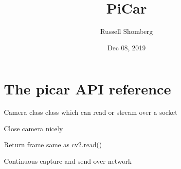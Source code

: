 \documentclass[letterpaper,10pt,english]{sphinxmanual}
\title{PiCar}
\date{Dec 08, 2019}
\author{Russell Shomberg}
\begin{document}
\pagestyle{empty}
\sphinxmaketitle
\pagestyle{plain}
\sphinxtableofcontents
\pagestyle{normal}
\label{\detokenize{index::doc}}



\chapter{The picar API reference}
\label{\detokenize{index:module-picar}}\label{\detokenize{index:the-picar-api-reference}}

\begin{fulllineitems}
\label{\detokenize{index:picar.Camera}}
Camera class class which can read or stream over a socket

\begin{fulllineitems}
\label{\detokenize{index:picar.Camera.close}}
Close camera nicely

\end{fulllineitems}


\begin{fulllineitems}
\label{\detokenize{index:picar.Camera.read}}
Return frame same as cv2.read()

\end{fulllineitems}


\begin{fulllineitems}
\label{\detokenize{index:picar.Camera.stream}}
Continuous capture and send over network

\end{fulllineitems}


\end{fulllineitems}

\end{document}
